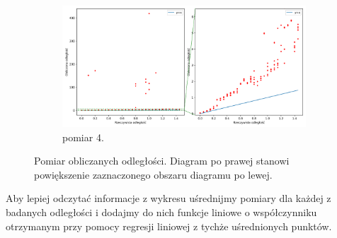 \begin{figure}[H]
    \ContinuedFloat\centering
    \begin{subfigure}{\textwidth}
        \centering
        \includegraphics[width=\textwidth]{pics/mic_sync_dist/dists_long_3.png}
        \caption{pomiar 4.}
        \label{pic:slope_test_3}
    \end{subfigure}
    \caption[Pomiar obliczanych odległości]{Pomiar obliczanych odległości. Diagram po prawej stanowi powiększenie zaznaczonego obszaru diagramu po lewej.}
    \label{fig:slope_test}
\end{figure}

Aby lepiej odczytać informacje z wykresu uśrednijmy pomiary dla każdej z badanych odległości i dodajmy do nich funkcje liniowe o współczynniku otrzymanym przy pomocy regresji liniowej z tychże uśrednionych punktów.

